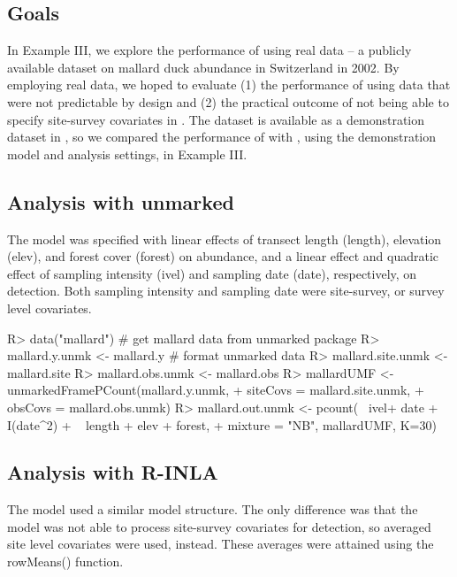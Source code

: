 \documentclass[article]{jss}
\begin{document}
\subsection[Goals]{Goals}
In Example III, we explore the performance of  using real data -- a publicly available dataset on mallard duck abundance in Switzerland in 2002. By employing real data, we hoped to evaluate (1) the performance of  using data that were not predictable by design and (2) the practical outcome of not being able to specify site-survey covariates in . The dataset is available as a demonstration dataset in , so we compared the performance of  with , using the demonstration model and analysis settings, in Example III.

\subsection[Analysis with unmarked]{Analysis with unmarked}
The  model was specified with linear effects of transect length (length), elevation (elev), and forest cover (forest) on abundance, and a linear effect and quadratic effect of sampling intensity (ivel) and sampling date (date), respectively, on detection. Both sampling intensity and sampling date were site-survey, or survey level covariates.

\begin{Code}
R> data("mallard") # get mallard data from unmarked package
R> mallard.y.unmk <- mallard.y # format unmarked data
R> mallard.site.unmk <- mallard.site
R> mallard.obs.unmk <- mallard.obs
R> mallardUMF <- unmarkedFramePCount(mallard.y.unmk, 
+                                    siteCovs = mallard.site.unmk,
+                                    obsCovs = mallard.obs.unmk)
R> mallard.out.unmk <- pcount(~ ivel+ date + I(date^2)
+                             ~ length + elev + forest,
+                               mixture = "NB", mallardUMF, K=30) 
\end{Code}

\subsection[Analysis with R-INLA]{Analysis with R-INLA}
The  model used a similar model structure. The only difference was that the  model was not able to process site-survey covariates for detection, so averaged site level covariates were used, instead. These averages were attained using the rowMeans() function.
\end{document}
